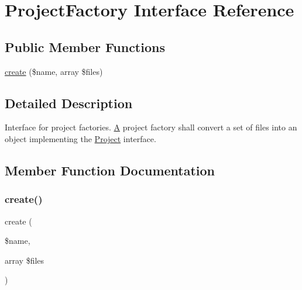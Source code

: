 \hypertarget{interfacephp_documentor_1_1_reflection_1_1_project_factory}{}\section{Project\+Factory Interface Reference}
\label{interfacephp_documentor_1_1_reflection_1_1_project_factory}
\subsection*{Public Member Functions}
\begin{DoxyCompactItemize}
\item 
\mbox{\hyperlink{interfacephp_documentor_1_1_reflection_1_1_project_factory_a4385a0ec62a62ff99b176f5558dce73e}{create}} (\$name, array \$files)
\end{DoxyCompactItemize}


\subsection{Detailed Description}
Interface for project factories. \mbox{\hyperlink{class_a}{A}} project factory shall convert a set of files into an object implementing the \mbox{\hyperlink{interfacephp_documentor_1_1_reflection_1_1_project}{Project}} interface. 

\subsection{Member Function Documentation}
\mbox{\label{interfacephp_documentor_1_1_reflection_1_1_project_factory_a4385a0ec62a62ff99b176f5558dce73e}} 
\subsubsection{\texorpdfstring{create()}{create()}}
{\footnotesize\ttfamily create (\begin{DoxyParamCaption}\item[{}]{\$name,  }\item[{array}]{\$files }\end{DoxyParamCaption})}

